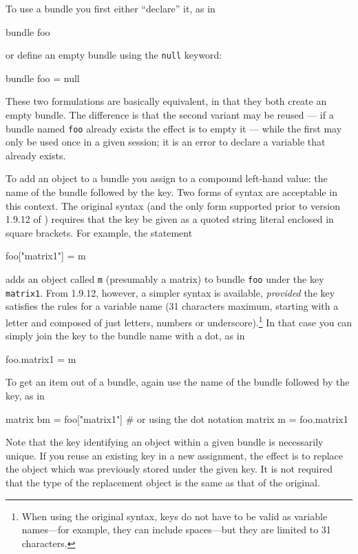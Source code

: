 To use a bundle you first either ``declare'' it, as in
%
\begin{code}
bundle foo
\end{code}
%
or define an empty bundle using the \texttt{null} keyword:
%
\begin{code}
bundle foo = null
\end{code}
%
These two formulations are basically equivalent, in that they both
create an empty bundle. The difference is that the second variant
may be reused --- if a bundle named \texttt{foo} already exists the
effect is to empty it --- while the first may only be used once in
a given  session; it is an error to declare a variable that
already exists. 

To add an object to a bundle you assign to a compound left-hand value:
the name of the bundle followed by the key. Two forms of syntax are
acceptable in this context. The original syntax (and the only form
supported prior to version 1.9.12 of ) requires that the
key be given as a quoted string literal enclosed in square brackets.
For example, the statement

\begin{code}
foo["matrix1"] = m
\end{code}

adds an object called \texttt{m} (presumably a matrix) to bundle
\texttt{foo} under the key \texttt{matrix1}. From  1.9.12,
however, a simpler syntax is available, \emph{provided} the key
satisfies the rules for a  variable name (31 characters
maximum, starting with a letter and composed of just letters, numbers
or underscore).\footnote{When using the original syntax, keys do not
  have to be valid as variable names---for example, they can include
  spaces---but they are limited to 31 characters.}  In that case you
can simply join the key to the bundle name with a dot, as in

\begin{code}
foo.matrix1 = m
\end{code}

To get an item out of a bundle, again use the name of the bundle
followed by the key, as in

\begin{code}
matrix bm = foo["matrix1"]
# or using the dot notation
matrix m = foo.matrix1
\end{code}

Note that the key identifying an object within a given bundle is
necessarily unique. If you reuse an existing key in a new assignment,
the effect is to replace the object which was previously stored under
the given key. It is not required that the type of the replacement
object is the same as that of the original.

